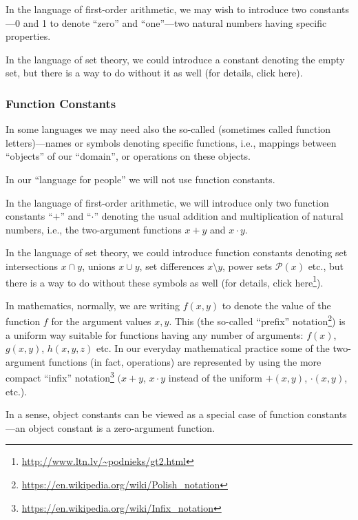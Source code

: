 \begin{example}
In the language of first-order arithmetic, we may wish to introduce two constants---0 and 1 to denote ``zero'' and ``one''---two natural numbers having specific properties.
\end{example}

\begin{example}
In the language of set theory, we could introduce a constant denoting the empty set, but there is a way to do without it as well (for details, click here).
\end{example}

\subsubsection*{Function Constants}

In some languages we may need also the so-called  (sometimes called function letters)---names or symbols denoting specific functions, i.e., mappings between ``objects'' of our ``domain'', or operations on these objects.

\begin{example}
In our ``language for people'' we will not use function constants.
\end{example}

\begin{example}
In the language of first-order arithmetic, we will introduce only two function constants ``\(+\)'' and ``\(\cdot\)'' denoting the usual addition and multiplication of natural numbers, i.e., the two-argument functions \(x+y\) and \(x\cdot y\).
\end{example}

\begin{example}
In the language of set theory, we could introduce function constants denoting set intersections \(x\cap y\), unions \(x\cup y\), set differences \(x\setminus y\), power sets \(\mathcal{P}(x)\) etc., but there is a way to do without these symbols as well (for details, click here\footnote{\url{http://www.ltn.lv/~podnieks/gt2.html}}).
\end{example}
In mathematics, normally, we are writing \(f(x,y)\) to denote the value of the function \(f\) for the argument values \(x,y\).
This (the so-called ``prefix'' notation\footnote{\url{https://en.wikipedia.org/wiki/Polish\_notation}}) is a uniform way suitable for functions having any number of arguments: \(f(x)\), \(g(x,y)\), \(h(x,y,z)\) etc.
In our everyday mathematical practice some of the two-argument functions (in fact, operations) are represented by using the more compact ``infix'' notation\footnote{\url{https://en.wikipedia.org/wiki/Infix\_notation}} \((x+y\), \(x\cdot y\) instead of the uniform \(+(x, y)\), \(\cdot(x, y)\), etc.).
\begin{note}
In a sense, object constants can be viewed as a special case of function constants---an object constant is a zero-argument function.
\end{note}

